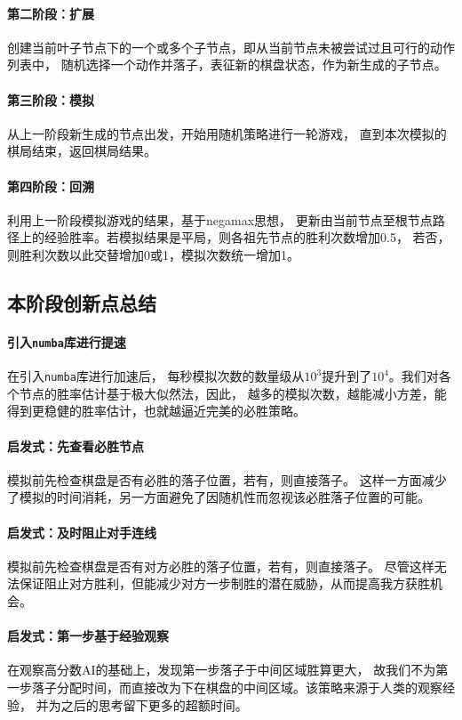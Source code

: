 \documentclass{article}
\begin{document}
\paragraph{第二阶段：扩展} 创建当前叶子节点下的一个或多个子节点，即从当前节点未被尝试过且可行的动作列表中，
随机选择一个动作并落子，表征新的棋盘状态，作为新生成的子节点。

\paragraph{第三阶段：模拟} 从上一阶段新生成的节点出发，开始用随机策略进行一轮游戏，
直到本次模拟的棋局结束，返回棋局结果。

\paragraph{第四阶段：回溯} 利用上一阶段模拟游戏的结果，基于negamax思想，
更新由当前节点至根节点路径上的经验胜率。若模拟结果是平局，则各祖先节点的胜利次数增加0.5，
若否，则胜利次数以此交替增加0或1，模拟次数统一增加1。

\subsection{本阶段创新点总结}

\paragraph{引入\texttt{numba}库进行提速}在引入\texttt{numba}库进行加速后，
每秒模拟次数的数量级从$10^3$提升到了$10^4$。我们对各个节点的胜率估计基于极大似然法，因此，
越多的模拟次数，越能减小方差，能得到更稳健的胜率估计，也就越逼近完美的必胜策略。

\paragraph{启发式：先查看必胜节点} 模拟前先检查棋盘是否有必胜的落子位置，若有，则直接落子。
这样一方面减少了模拟的时间消耗，另一方面避免了因随机性而忽视该必胜落子位置的可能。

\paragraph{启发式：及时阻止对手连线} 模拟前先检查棋盘是否有对方必胜的落子位置，若有，则直接落子。
尽管这样无法保证阻止对方胜利，但能减少对方一步制胜的潜在威胁，从而提高我方获胜机会。

\paragraph{启发式：第一步基于经验观察}在观察高分数AI的基础上，发现第一步落子于中间区域胜算更大，
故我们不为第一步落子分配时间，而直接改为下在棋盘的中间区域。该策略来源于人类的观察经验，
并为之后的思考留下更多的超额时间。
\end{document}
